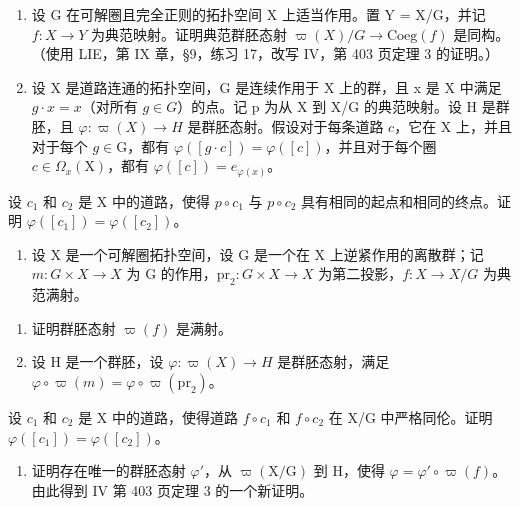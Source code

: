 \begin{enumerate}
\def\labelenumi{\arabic{enumi})}
\setcounter{enumi}{4}
\item
  设 G 在可解圈且完全正则的拓扑空间 X 上适当作用。置 Y = X/G，并记 \(f: X \to Y\) 为典范映射。证明典范群胚态射 \(\varpi(X)/G \to \text{Coeg}(f)\) 是同构。（使用 LIE，第 IX 章，§9，练习 17，改写 IV，第 403 页定理 3 的证明。）
\item
 设 X 是道路连通的拓扑空间，G 是连续作用于 X 上的群，且 x 是 X 中满足 \(g \cdot x = x\)（对所有 \(g \in G\)）的点。记 p 为从 X 到 X/G 的典范映射。设 H 是群胚，且 \(\varphi: \varpi(X) \to H\) 是群胚态射。假设对于每条道路 \(c\)，它在 \(\mathrm{X}\) 上，并且对于每个 \(g\in \mathrm{G}\)，都有 \(\varphi ([g\cdot c]) = \varphi ([c])\)，并且对于每个圈 \(c\in \Omega_x(\mathrm{X})\)，都有 \(\varphi ([c]) = e_{\varphi (x)}\)。
\end{enumerate}

设 \(c_{1}\) 和 \(c_{2}\) 是 X 中的道路，使得 \(p \circ c_{1}\) 与 \(p \circ c_{2}\) 具有相同的起点和相同的终点。证明 \(\varphi([c_{1}]) = \varphi([c_{2}])\)。

\begin{enumerate}
\def\labelenumi{\arabic{enumi})}
\setcounter{enumi}{6}
\tightlist
\item
  设 X 是一个可解圈拓扑空间，设 G 是一个在 X 上逆紧作用的离散群；记 \(m\colon G \times X \to X\) 为 G 的作用，\(\mathrm{pr}_2\colon G \times X \to X\) 为第二投影，\(f\colon X \to X / G\) 为典范满射。
\end{enumerate}

\begin{enumerate}
\def\labelenumi{\alph{enumi})}
\item
  证明群胚态射 \(\varpi(f)\) 是满射。
\item
  设 H 是一个群胚，设 \(\varphi\colon\varpi(X)\to H\) 是群胚态射，满足 \(\varphi\circ\varpi(m)=\varphi\circ\varpi(\mathrm{pr}_{2})\)。
\end{enumerate}

设 \(c_{1}\) 和 \(c_{2}\) 是 X 中的道路，使得道路 \(f \circ c_{1}\) 和 \(f \circ c_{2}\) 在 X/G 中严格同伦。证明 \(\varphi([c_{1}]) = \varphi([c_{2}])\)。

\begin{enumerate}
\def\labelenumi{\alph{enumi})}
\setcounter{enumi}{2}
\tightlist
\item
  证明存在唯一的群胚态射 \(\varphi'\)，从 \(\varpi(\mathrm{X/G})\) 到 H，使得 \(\varphi = \varphi' \circ \varpi(f)\)。由此得到 IV 第 403 页定理 3 的一个新证明。
\end{enumerate}

